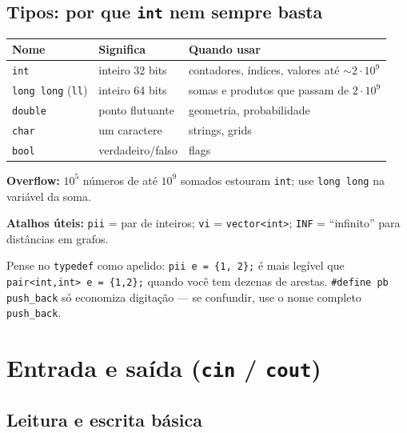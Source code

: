 \subsection{Tipos: por que \texttt{int} nem sempre basta}

\begin{center}
\small
\begin{tabular}{@{}lll@{}}
  \toprule
  \textbf{Nome} & \textbf{Significa} & \textbf{Quando usar} \\
  \midrule
  \texttt{int} & inteiro 32 bits & contadores, índices, valores até $\sim 2 \cdot 10^9$ \\
  \texttt{long long} (\texttt{ll}) & inteiro 64 bits & somas e produtos que passam de $2 \cdot 10^9$ \\
  \texttt{double} & ponto flutuante & geometria, probabilidade \\
  \texttt{char} & um caractere & strings, grids \\
  \texttt{bool} & verdadeiro/falso & flags \\
  \bottomrule
\end{tabular}
\end{center}

\textbf{Overflow:} $10^5$ números de até $10^9$ somados estouram \texttt{int}; use \texttt{long long} na variável da soma.

\textbf{Atalhos úteis:} \texttt{pii} = par de inteiros; \texttt{vi} = \texttt{vector<int>}; \texttt{INF} = ``infinito'' para distâncias em grafos.

\begin{exemplodiabox}
Pense no \texttt{typedef} como apelido: \texttt{pii e = \{1, 2\};} é mais legível que \texttt{pair<int,int> e = \{1,2\};} quando você tem dezenas de arestas. \texttt{\#define pb push\_back} só economiza digitação --- se confundir, use o nome completo \texttt{push\_back}.
\end{exemplodiabox}


\section{Entrada e saída (\texttt{cin} / \texttt{cout})}

\subsection{Leitura e escrita básica}

